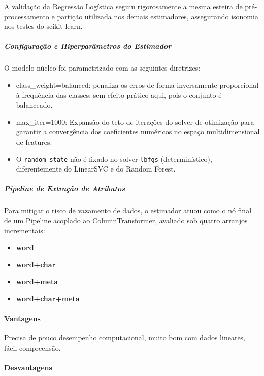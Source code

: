 \documentclass[
  brazilian,
  11pt,
]{article}
\providecommand{\tightlist}{%
  \setlength{\itemsep}{0pt}\setlength{\parskip}{0pt}}
\begin{document}
A validação da Regressão Logística seguiu rigorosamente a mesma esteira de pré-processamento e partição utilizada nos demais estimadores, assegurando isonomia nos testes do scikit-learn.

\subparagraph{Configuração e Hiperparâmetros do Estimador}\label{configurauxe7uxe3o-e-hiperparuxe2metros-do-estimador-2}

O modelo núcleo foi parametrizado com as seguintes diretrizes:

\begin{itemize}
\tightlist
\item
  class\_weight=\textquotesingle balanced\textquotesingle: penaliza os erros de forma inversamente proporcional à frequência das classes; sem efeito prático aqui, pois o conjunto é balanceado.
\item
  max\_iter=1000: Expansão do teto de iterações do solver de otimização para garantir a convergência dos coeficientes numéricos no espaço multidimensional de features.
\item
  O \texttt{random\_state} não é fixado no solver \texttt{lbfgs} (determinístico), diferentemente do LinearSVC e do Random Forest.
\end{itemize}

\subparagraph{Pipeline de Extração de Atributos}\label{pipeline-de-extrauxe7uxe3o-de-atributos-2}

Para mitigar o risco de vazamento de dados, o estimador atuou como o nó final de um Pipeline acoplado ao ColumnTransformer, avaliado sob quatro arranjos incrementais:

\begin{itemize}
\tightlist
\item
  \textbf{word}
\item
  \textbf{word+char}
\item
  \textbf{word+meta}
\item
  \textbf{word+char+meta}
\end{itemize}

\paragraph{Vantagens}\label{vantagens-2}

Precisa de pouco desempenho computacional, muito bom com dados lineares, fácil compreensão.

\paragraph{Desvantagens}\label{desvantagens-2}
\end{document}

